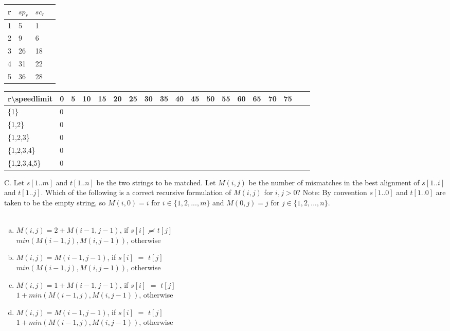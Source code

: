 \documentclass[12pt]{article}
\begin{document}
\begin{table}[]
    \begin{tabular}{|l|l|l|l|}
    \hline
    r & $sp_r$ & $sc_r$ \\ \hline
    1 & 5    & 1    \\ \hline
    2 & 9    & 6    \\ \hline
    3 & 26    & 18    \\ \hline
    4 & 31    & 22    \\ \hline
    5 & 36    & 28    \\ \hline
    \end{tabular}
    \end{table}
    \FloatBarrier
    \begin{table}[]
        \begin{tabular}{|l|l|l|l|l|l|l|l|l|l|l|l|l|l|l|l|l|l|l|}
        \hline
        r\textbackslash{}speedlimit & 0 & 5 & 10 & 15 & 20 & 25 & 30  & 35 & 40 & 45 & 50 & 55 & 60 & 65 & 70 & 75 \\ \hline
        \{1\}                  & 0 &   &   &   &   &   &    &   &   &   &    &    &    &    &    &  \\ \hline
        \{1,2\}                  & 0 &   &   &   &   &   &    &   &   &   &    &    &    &    &    &     \\ \hline
        \{1,2,3\}                  & 0 &   &   &   &   &   &    &   &   &   &    &    &    &    &    &    \\ \hline
        \{1,2,3,4\}                  & 0 &   &   &   &   &   &    &   &   &   &    &    &    &    &    &      \\ \hline
        \{1,2,3,4,5\}                  & 0 &   &   &   &   &   &    &   &   &   &    &    &    &    &    &     \\ \hline
        \end{tabular}
        \end{table}
        \FloatBarrier
\newpage
\noindent C. Let $s[1..m]$ and $t[1..n]$ be the two strings to be matched. 
Let $M(i,j)$ be the number of mismatches in the best alignment of $s[1..i]$ 
and $t[1..j]$. Which of the following is a correct recursive formulation 
of $M(i,j)$ for $i,j > 0$? Note: By convention $s[1..0]$ and $t[1..0]$ are taken 
to be the empty string, so $M(i, 0) = i$ for $i \in \{1,2,...,m\}$ and $M(0,j) = j$ 
for $j \in \{1,2,...,n\}$.\\\\
\begin{enumerate}[a)]
    \item $M(i,j) = 2+M(i-1,j-1)$, if $s[i]$ $\cancel{=}$ $t[j]$\\
    $min(M(i-1,j),M(i,j-1))$, otherwise
    \item $M(i,j) = M(i-1,j-1)$, if $s[i]$ $=$ $t[j]$\\
    $min(M(i-1,j),M(i,j-1))$, otherwise
    \item $M(i,j) = 1+M(i-1,j-1)$, if $s[i]$ $=$ $t[j]$\\
    $1+min(M(i-1,j),M(i,j-1))$, otherwise
    \item $M(i,j) = M(i-1,j-1)$, if $s[i]$ $=$ $t[j]$\\
    $1+min(M(i-1,j),M(i,j-1))$, otherwise
\end{enumerate}
\end{document}
